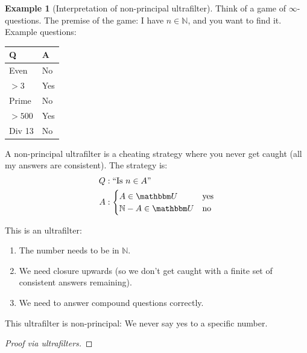 \documentclass[11pt]{article}
\numberwithin{equation}{section}
\theoremstyle{plain}
\theoremstyle{definition}
\newtheorem{example}{\color{WildStrawberry}Example}[section]
\newcommand{\1}{\mathbbm 1}
\newcommand{\NN}{\mathbb N}
\newcommand{\UU}{\mathbbm U}
\begin{document}
\begin{example}[Interpretation of non-principal ultrafilter]
	Think of a game of $\infty$-questions. The premise of the game: I have $n \in \NN$, and you want to find it. Example questions:
	\begin{center}
		\begin{tabular}{l|l}
			Q & A \\
			\hline 
			Even & No \\
			$> 3$ & Yes \\
			Prime & No \\
			$> 500$ & Yes \\
			Div 13 & No
		\end{tabular}
	\end{center}
	A non-principal ultrafilter is a cheating strategy where you never get caught (all my answers are consistent). The strategy is: 
	\begin{align*}
		Q &: \text{``Is $n \in A$''} \\
		A &:
		\begin{cases}
			A \in \UU & \text{yes} \\
			\NN - A \in \UU & \text{no}
		\end{cases}
	\end{align*}

	This is an ultrafilter:
	\begin{enumerate}
		\item The number needs to be in $\NN$. 
		\item We need closure upwards (so we don't get caught with a finite set of consistent answers remaining).
		\item We need to answer compound questions correctly. 
	\end{enumerate}

	This ultrafilter is non-principal: We never say yes to a specific number. 
\end{example}



\begin{proof}[Proof via ultrafilters]

\end{proof}


\end{document}
